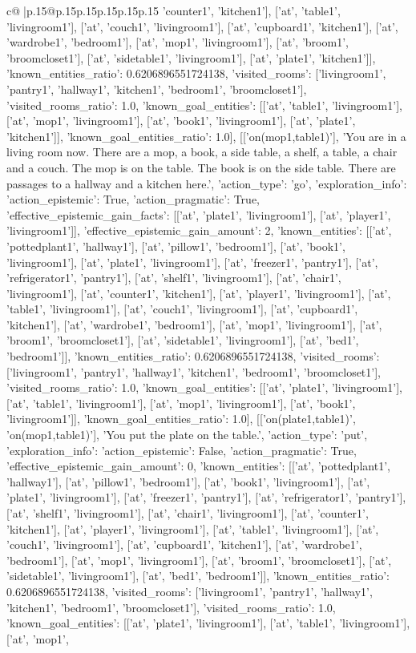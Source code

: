 \documentclass{article}
\begin{document}
{\begin{supertabular}{c@{$\;$}|p{.15\linewidth}@{}p{.15\linewidth}p{.15\linewidth}p{.15\linewidth}p{.15\linewidth}p{.15\linewidth}}
{{{'counter1', 'kitchen1'], ['at', 'table1', 'livingroom1'], ['at', 'couch1', 'livingroom1'], ['at', 'cupboard1', 'kitchen1'], ['at', 'wardrobe1', 'bedroom1'], ['at', 'mop1', 'livingroom1'], ['at', 'broom1', 'broomcloset1'], ['at', 'sidetable1', 'livingroom1'], ['at', 'plate1', 'kitchen1']], 'known_entities_ratio': 0.6206896551724138, 'visited_rooms': ['livingroom1', 'pantry1', 'hallway1', 'kitchen1', 'bedroom1', 'broomcloset1'], 'visited_rooms_ratio': 1.0, 'known_goal_entities': [['at', 'table1', 'livingroom1'], ['at', 'mop1', 'livingroom1'], ['at', 'book1', 'livingroom1'], ['at', 'plate1', 'kitchen1']], 'known_goal_entities_ratio': 1.0}}], [['on(mop1,table1)'], 'You are in a living room now. There are a mop, a book, a side table, a shelf, a table, a chair and a couch. The mop is on the table. The book is on the side table. There are passages to a hallway and a kitchen here.', {'action_type': 'go', 'exploration_info': {'action_epistemic': True, 'action_pragmatic': True, 'effective_epistemic_gain_facts': [['at', 'plate1', 'livingroom1'], ['at', 'player1', 'livingroom1']], 'effective_epistemic_gain_amount': 2, 'known_entities': [['at', 'pottedplant1', 'hallway1'], ['at', 'pillow1', 'bedroom1'], ['at', 'book1', 'livingroom1'], ['at', 'plate1', 'livingroom1'], ['at', 'freezer1', 'pantry1'], ['at', 'refrigerator1', 'pantry1'], ['at', 'shelf1', 'livingroom1'], ['at', 'chair1', 'livingroom1'], ['at', 'counter1', 'kitchen1'], ['at', 'player1', 'livingroom1'], ['at', 'table1', 'livingroom1'], ['at', 'couch1', 'livingroom1'], ['at', 'cupboard1', 'kitchen1'], ['at', 'wardrobe1', 'bedroom1'], ['at', 'mop1', 'livingroom1'], ['at', 'broom1', 'broomcloset1'], ['at', 'sidetable1', 'livingroom1'], ['at', 'bed1', 'bedroom1']], 'known_entities_ratio': 0.6206896551724138, 'visited_rooms': ['livingroom1', 'pantry1', 'hallway1', 'kitchen1', 'bedroom1', 'broomcloset1'], 'visited_rooms_ratio': 1.0, 'known_goal_entities': [['at', 'plate1', 'livingroom1'], ['at', 'table1', 'livingroom1'], ['at', 'mop1', 'livingroom1'], ['at', 'book1', 'livingroom1']], 'known_goal_entities_ratio': 1.0}}], [['on(plate1,table1)', 'on(mop1,table1)'], 'You put the plate on the table.', {'action_type': 'put', 'exploration_info': {'action_epistemic': False, 'action_pragmatic': True, 'effective_epistemic_gain_amount': 0, 'known_entities': [['at', 'pottedplant1', 'hallway1'], ['at', 'pillow1', 'bedroom1'], ['at', 'book1', 'livingroom1'], ['at', 'plate1', 'livingroom1'], ['at', 'freezer1', 'pantry1'], ['at', 'refrigerator1', 'pantry1'], ['at', 'shelf1', 'livingroom1'], ['at', 'chair1', 'livingroom1'], ['at', 'counter1', 'kitchen1'], ['at', 'player1', 'livingroom1'], ['at', 'table1', 'livingroom1'], ['at', 'couch1', 'livingroom1'], ['at', 'cupboard1', 'kitchen1'], ['at', 'wardrobe1', 'bedroom1'], ['at', 'mop1', 'livingroom1'], ['at', 'broom1', 'broomcloset1'], ['at', 'sidetable1', 'livingroom1'], ['at', 'bed1', 'bedroom1']], 'known_entities_ratio': 0.6206896551724138, 'visited_rooms': ['livingroom1', 'pantry1', 'hallway1', 'kitchen1', 'bedroom1', 'broomcloset1'], 'visited_rooms_ratio': 1.0, 'known_goal_entities': [['at', 'plate1', 'livingroom1'], ['at', 'table1', 'livingroom1'], ['at', 'mop1', }}}
\end{supertabular}}
\end{document}
